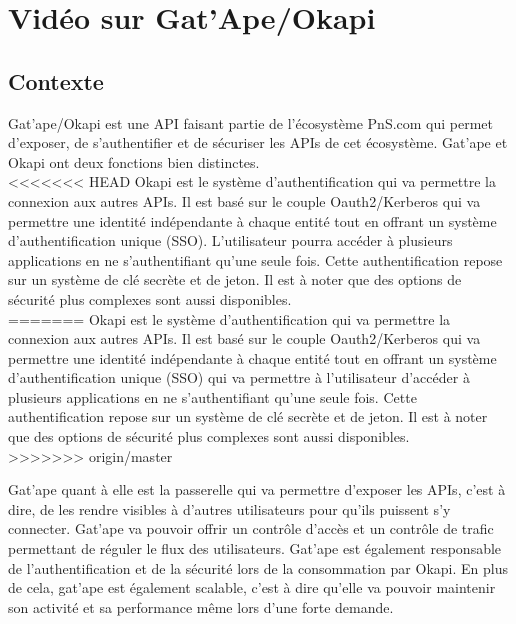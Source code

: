\section{Vidéo sur Gat'Ape/Okapi}

\subsection{Contexte}
Gat'ape/Okapi est une API faisant partie de l'écosystème PnS.com qui permet d'exposer, de s'authentifier et de sécuriser les APIs de cet écosystème. Gat'ape et Okapi ont deux fonctions bien distinctes.\\

<<<<<<< HEAD
Okapi est le système d'authentification qui va permettre la connexion aux autres APIs. Il est basé sur le couple Oauth2/Kerberos qui va permettre une identité indépendante à chaque entité tout en offrant un système d'authentification unique (SSO). L'utilisateur pourra accéder à plusieurs applications en ne s'authentifiant qu'une seule fois. Cette authentification repose sur un système de clé secrète et de jeton. Il est à noter que des options de sécurité plus complexes sont aussi disponibles.\\
=======
Okapi est le système d'authentification qui va permettre la connexion aux autres APIs. Il est basé sur le couple Oauth2/Kerberos qui va permettre une identité indépendante à chaque entité tout en offrant un système d'authentification unique (SSO) qui va permettre à l'utilisateur d'accéder à plusieurs applications en ne s'authentifiant qu'une seule fois. Cette authentification repose sur un système de clé secrète et de jeton. Il est à noter que des options de sécurité plus complexes sont aussi disponibles.\\
>>>>>>> origin/master

Gat'ape quant à elle est la passerelle qui va permettre d'exposer les APIs, c'est à dire, de les rendre visibles à d'autres utilisateurs pour qu'ils puissent s'y connecter. Gat'ape va pouvoir offrir un contrôle d'accès et un contrôle de trafic permettant de réguler le flux des utilisateurs. Gat'ape est également responsable  de l'authentification et de la sécurité lors de la consommation par Okapi. En plus de cela, gat'ape est également scalable, c'est à dire qu'elle va pouvoir maintenir son activité et sa performance même lors d'une forte demande.\\


